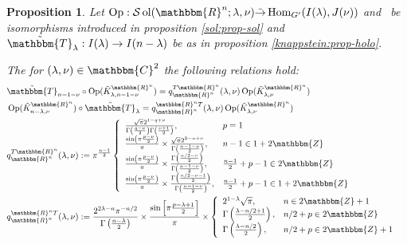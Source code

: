\documentclass{article}
\newcommand{\assign}{:=}
\newcommand{\tmop}[1]{\ensuremath{\operatorname{#1}}}
\newtheorem{proposition}{Proposition}
{\theorembodyfont{\rmfamily}\newtheorem{remark}{Remark}}
\begin{document}
\begin{proposition}
  \label{funcident:prop-main}Let $\tmop{Op} : \mathcal{S} \tmop{ol}
  (\mathbbm{R}^n ; \lambda, \nu) \tilde{\rightarrow} \tmop{Hom}_{G'} (I
  (\lambda), J (\nu))$ and \ be isomorphisms introduced in proposition
  \ref{sol:prop-sol} and $\tilde{\mathbbm{T}}_{\lambda} : I (\lambda)
  \rightarrow I (n - \lambda)$ be as in proposition
  \ref{knappstein:prop-holo}.
  
  The for $(\lambda, \nu) \in \mathbbm{C}^2$ the following relations hold:
  \begin{eqnarray}
    & \tilde{\mathbbm{T}}_{n - 1 - \nu} \circ \tmop{Op} (\tilde{K}_{\lambda,
    n - 1 - \nu}^{\mathbbm{R}^n}) = q^{T\mathbbm{R}^n}_{\mathbbm{R}^n}
    (\lambda, \nu) \tmop{Op} (\tilde{K}_{\lambda, \nu}^{\mathbbm{R}^n}) & 
    \nonumber\\
    & \tmop{Op} (\tilde{K}_{n - \lambda, \nu}^{\mathbbm{R}^n}) \circ
    \tilde{\mathbbm{T}}_{\lambda} = q^{\mathbbm{R}^n T}_{\mathbbm{R}^n}
    (\lambda, \nu) \tmop{Op} (\tilde{K}_{\lambda, \nu}^{\mathbbm{R}^n}) & 
    \nonumber\\
    & q^{T\mathbbm{R}^n}_{\mathbbm{R}^n} (\lambda, \nu) \assign \pi^{\frac{n
    - 1}{2}} \left\{ \begin{array}{ll}
      \frac{\sqrt{\pi} 2^{1 - q + \nu}}{\Gamma \left( \frac{q - \nu}{2}
      \right) \Gamma \left( \frac{\nu + 1}{2} \right)}, & p = 1\\
      \frac{\sin \left( \pi \frac{p - \nu}{2} \right)}{\pi} \times
      \frac{\sqrt{\pi} 2^{2 - n + \nu}}{\Gamma \left( \frac{n - 1 - \nu}{2}
      \right)}, & n - 1 \in 1 + 2\mathbbm{Z}\\
      \frac{\sin \left( \pi \frac{p - \nu}{2} \right)}{\pi} \times
      \frac{\Gamma \left( \frac{n / 2 - \nu}{2} \right)}{\Gamma \left( \frac{n
      - 1 - \nu}{2} \right)}, & \frac{n - 1}{2} + p - 1 \in 2\mathbbm{Z}\\
      \frac{\sin \left( \pi \frac{p - \nu}{2} \right)}{\pi} \times
      \frac{\Gamma \left( \frac{n / 2 - \nu - 1}{2} \right)}{\Gamma \left(
      \frac{n - 1 - \nu}{2} \right)}, & \frac{n - 1}{2} + p - 1 \in 1 +
      2\mathbbm{Z}
    \end{array} \right. &  \nonumber\\
    & q^{\mathbbm{R}^n T}_{\mathbbm{R}^n} (\lambda, \nu) \assign \frac{2^{2
    \lambda - n} \pi^{- n / 2}}{\Gamma \left( \frac{n - \lambda}{2} \right)}
    \times \frac{\sin \left[ \pi \frac{p - \lambda + 1}{2} \right]}{\pi}
    \times \left\{ \begin{array}{ll}
      2^{1 - \lambda} \sqrt{\pi}, & n \in 2\mathbbm{Z}+ 1\\
      \Gamma \left( \frac{\lambda - n / 2 + 1}{2} \right), & n / 2 + p \in
      2\mathbbm{Z}\\
      \Gamma \left( \frac{\lambda - n / 2}{2} \right), & n / 2 + p \in
      2\mathbbm{Z}+ 1
    \end{array} \right. &  \nonumber
  \end{eqnarray}
\end{proposition}
\end{document}

